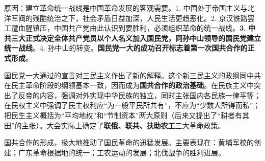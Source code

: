 原因：建立革命统一战线是中国革命发展的客观需要。1.
中国处于帝国主义与北洋军阀的残酷统治之下，社会矛盾日益加深，人民生活更趋恶化。2.
京汉铁路罢工遭血腥镇压，中国共产党由此认识到要胜利，必须组织革命的统一战线。{\textbf{3.}
}\textbf{中共三大正式决定全体共产党员以个人名义加入国民党，同孙中山领导的国民党建立统一战线}{。}{4.
孙中山的转变。}\textbf{国民党一大的成功召开标志着第一次国共合作的正式形成}{。}

国民党一大通过的宣言对三民主义作出了新的解释{。这个新三民主义的政纲同中共在民主革命阶段的纲领基本一致，因而成为}\textbf{{国共合作的政治基础}}{。在}民族主义中突出了反帝的内容，强调对外实现中华民族的独立，同时主张国内各民族一律平等{；}在民权主义中强调了民主权利应``为一般平民所共有''，不应为``少数人所得而私''{；}把民生主义概括为``平均地权''和``节制资本''两大原则{（后来又提出了``}耕者有其田{''的主张）。大会实际上确定了}\textbf{{联俄、联共、扶助农工}}{三大革命政策。}

{国共合作的形成，极大地推动了国民革命的迅猛发展。主要表现在：黄埔军校的创建；广东革命根据地的统一；工农运动的发展；北伐战争的胜利进展。}
